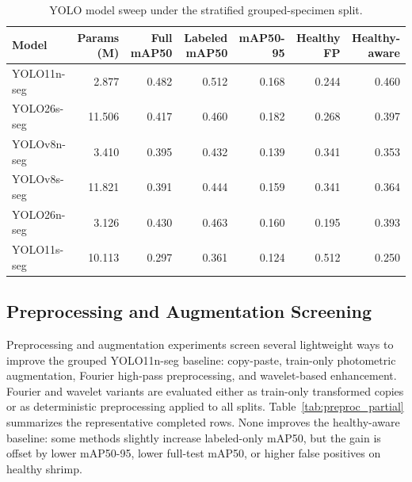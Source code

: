 \documentclass{svproc}
\begin{document}
\begin{table}
\caption{YOLO model sweep under the stratified grouped-specimen split.}
\label{tab:model_sweep}
\begin{center}
\scriptsize
\begin{tabular}{lrrrrrr}
\hline
Model & Params (M) & Full mAP50 & Labeled mAP50 & mAP50-95 & Healthy FP & Healthy-aware \\
\hline
YOLO11n-seg & 2.877 & 0.482 & 0.512 & 0.168 & 0.244 & 0.460 \\
YOLO26s-seg & 11.506 & 0.417 & 0.460 & 0.182 & 0.268 & 0.397 \\
YOLOv8n-seg & 3.410 & 0.395 & 0.432 & 0.139 & 0.341 & 0.353 \\
YOLOv8s-seg & 11.821 & 0.391 & 0.444 & 0.159 & 0.341 & 0.364 \\
YOLO26n-seg & 3.126 & 0.430 & 0.463 & 0.160 & 0.195 & 0.393 \\
YOLO11s-seg & 10.113 & 0.297 & 0.361 & 0.124 & 0.512 & 0.250 \\
\hline
\end{tabular}
\end{center}
\end{table}

\subsection{Preprocessing and Augmentation Screening}

Preprocessing and augmentation experiments screen several lightweight
ways to improve the grouped YOLO11n-seg baseline: copy-paste, train-only
photometric augmentation, Fourier high-pass preprocessing, and
wavelet-based enhancement. Fourier and wavelet variants are evaluated
either as train-only transformed copies or as deterministic preprocessing
applied to all splits. Table~\ref{tab:preproc_partial} summarizes the
representative completed rows. None improves the healthy-aware baseline:
some methods slightly increase labeled-only mAP50, but the gain is
offset by lower mAP50-95, lower full-test mAP50, or higher false
positives on healthy shrimp.
\end{document}
